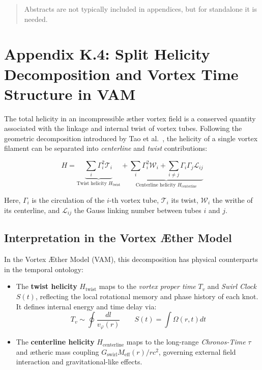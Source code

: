\documentclass[12pt]{article}
\begin{document}
  \titlepageOpen

  \begin{abstract}
      Abstracts are not typically included in appendices, but for standalone it is needed.
  \end{abstract}

  \titlepageClose
\fi

\section{\papertitle}
  \appendix
  \section*{Appendix K.4: Split Helicity Decomposition and Vortex Time Structure in VAM}

  The total helicity in an incompressible æther vortex field is a conserved quantity associated with the linkage and internal twist of vortex tubes. Following the geometric decomposition introduced by Tao et al.~\cite{Tao2021}, the helicity of a single vortex filament can be separated into \emph{centerline} and \emph{twist} contributions:

  \begin{equation}
    H = \underbrace{\sum_i \Gamma_i^2 \mathcal{T}_i}_{\text{Twist helicity } H_\text{twist}}
    + \underbrace{\sum_i \Gamma_i^2 \mathcal{W}_i + \sum_{i \ne j} \Gamma_i \Gamma_j \mathcal{L}_{ij}}_{\text{Centerline helicity } H_\text{centerline}}
  \end{equation}

  Here, $\Gamma_i$ is the circulation of the $i$-th vortex tube, $\mathcal{T}_i$ its twist, $\mathcal{W}_i$ the writhe of its centerline, and $\mathcal{L}_{ij}$ the Gauss linking number between tubes $i$ and $j$.

  \subsection*{Interpretation in the Vortex \AE{}ther Model}

  In the Vortex \AE{}ther Model (VAM), this decomposition has physical counterparts in the temporal ontology:

  \begin{itemize}
    \item The \textbf{twist helicity} $H_\text{twist}$ maps to the \emph{vortex proper time} $T_v$ and \emph{Swirl Clock} $S(t)$, reflecting the local rotational memory and phase history of each knot. It defines internal energy and time delay via:
    \[
      T_v \sim \oint \frac{dl}{v_\varphi(r)} \qquad S(t) = \int \Omega(r, t) dt
    \]
    \item The \textbf{centerline helicity} $H_\text{centerline}$ maps to the long-range \emph{Chronos-Time} $\tau$ and ætheric mass coupling $G_{\text{swirl}} M_{\text{eff}}(r) / rc^2$, governing external field interaction and gravitational-like effects.
  \end{itemize}
\end{document}

